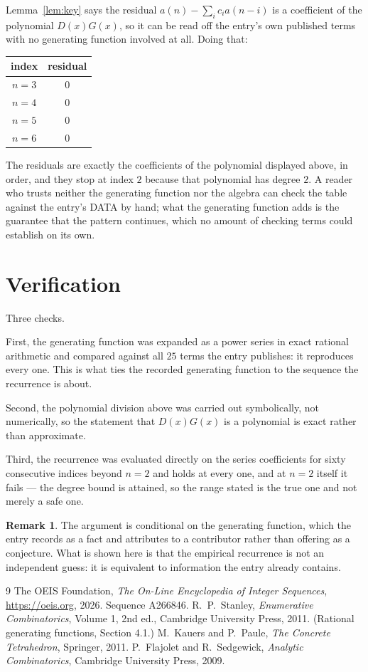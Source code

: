 \documentclass[11pt,a4paper]{article}
\theoremstyle{plain}
\theoremstyle{definition}
\newtheorem{remark}[theorem]{Remark}
\begin{document}
Lemma~\ref{lem:key} says the residual $a(n)-\sum_ic_ia(n-i)$ is a coefficient of the
polynomial $D(x)G(x)$, so it can be read off the entry's own published terms with no
generating function involved at all. Doing that:
\begin{center}
\begin{tabular}{cc}
index & residual \\ \hline
$n=3$ & $0$ \\
$n=4$ & $0$ \\
$n=5$ & $0$ \\
$n=6$ & $0$
\end{tabular}
\end{center}
The residuals are exactly the coefficients of the polynomial displayed above, in order, and
they stop at index $2$ because that polynomial has degree $2$. A reader who trusts
neither the generating function nor the algebra can check the table against the entry's DATA
by hand; what the generating function adds is the guarantee that the pattern continues, which
no amount of checking terms could establish on its own.

\section{Verification}

Three checks.

First, the generating function was expanded as a power series in exact rational arithmetic and
compared against all $25$ terms the entry publishes: it reproduces every one. This is
what ties the recorded generating function to the sequence the recurrence is about.

Second, the polynomial division above was carried out symbolically, not numerically, so the
statement that $D(x)G(x)$ is a polynomial is exact rather than approximate.

Third, the recurrence was evaluated directly on the series coefficients for sixty consecutive
indices beyond $n=2$ and holds at every one, and at $n=2$ itself it fails --- the
degree bound is attained, so the range stated is the true one and not merely a safe one.

\begin{remark}
The argument is conditional on the generating function, which the entry records as a fact and
attributes to a contributor rather than offering as a conjecture. What is shown here is that
the empirical recurrence is not an independent guess: it is equivalent to information the
entry already contains.
\end{remark}

\begin{thebibliography}{9}
 The OEIS Foundation, \emph{The On-Line Encyclopedia of Integer
Sequences}, \url{https://oeis.org}, 2026. Sequence A266846.
 R.~P.~Stanley, \emph{Enumerative Combinatorics}, Volume 1, 2nd ed.,
Cambridge University Press, 2011. (Rational generating functions, Section 4.1.)
 M.~Kauers and P.~Paule, \emph{The Concrete Tetrahedron}, Springer, 2011.
 P.~Flajolet and R.~Sedgewick, \emph{Analytic Combinatorics}, Cambridge
University Press, 2009.
\end{thebibliography}
\end{document}
